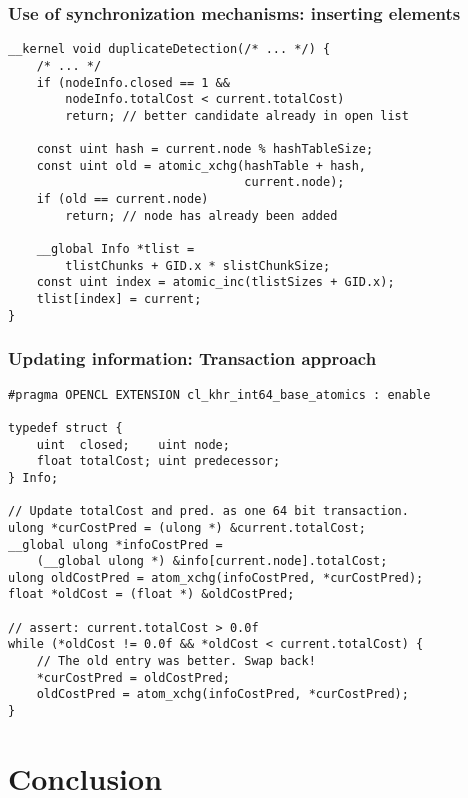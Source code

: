 \documentclass{beamer}
\begin{document}
\begin{frame}[fragile]
    \frametitle{Use of synchronization mechanisms: inserting elements}
    \begin{lstlisting}
__kernel void duplicateDetection(/* ... */) {
    /* ... */
    if (nodeInfo.closed == 1 &&
        nodeInfo.totalCost < current.totalCost)
        return; // better candidate already in open list

    const uint hash = current.node % hashTableSize;
    const uint old = atomic_xchg(hashTable + hash,
                                 current.node);
    if (old == current.node)
        return; // node has already been added

    __global Info *tlist =
        tlistChunks + GID.x * slistChunkSize;
    const uint index = atomic_inc(tlistSizes + GID.x);
    tlist[index] = current;
}
    \end{lstlisting}
\end{frame}

\begin{frame}[fragile]
    \frametitle{Updating information: Transaction approach}
    \begin{lstlisting}
#pragma OPENCL EXTENSION cl_khr_int64_base_atomics : enable

typedef struct {
    uint  closed;    uint node;
    float totalCost; uint predecessor;
} Info;

// Update totalCost and pred. as one 64 bit transaction.
ulong *curCostPred = (ulong *) &current.totalCost;
__global ulong *infoCostPred =
    (__global ulong *) &info[current.node].totalCost;
ulong oldCostPred = atom_xchg(infoCostPred, *curCostPred);
float *oldCost = (float *) &oldCostPred;

// assert: current.totalCost > 0.0f
while (*oldCost != 0.0f && *oldCost < current.totalCost) {
    // The old entry was better. Swap back!
    *curCostPred = oldCostPred;
    oldCostPred = atom_xchg(infoCostPred, *curCostPred);
}
    \end{lstlisting}
\end{frame}

\section{Conclusion}
\end{document}
